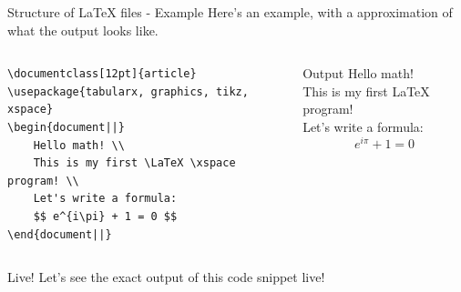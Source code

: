 \documentclass[10pt,xcolor={dvipsnames}, aspectratio=169]{beamer}
\begin{document}
\begin{frame}[fragile]{Structure of \LaTeX \xspace files - Example}
    Here's an example, with a approximation of what the output looks like.
    \smallskip
    \begin{columns}
        \begin{column}{0.5 \textwidth}
        \begin{verbatim}
\documentclass[12pt]{article}
\usepackage{tabularx, graphics, tikz, xspace}
\begin{document||}
    Hello math! \\
    This is my first \LaTeX \xspace program! \\
    Let's write a formula:
    $$ e^{i\pi} + 1 = 0 $$
\end{document||}
    \end{verbatim}
		\end{column}
		\begin{column}{0.5 \textwidth}
		\begin{block}{Output}
			Hello math! \\
            This is my first \LaTeX \xspace program! \\
            Let's write a formula:
            $$ e^{i\pi} + 1 = 0 $$
		\end{block}
		\end{column}
    \end{columns}
    \bigskip
    \begin{center}
    \begin{columns}
        \begin{column}{0.5 \textwidth}
        \begin{block}{Live!}
            Let's see the exact output of this code snippet \textcolor{latexBird}{live}!
		\end{block}
		\end{column}
    \end{columns}
    \end{center}
\end{frame}
\end{document}

